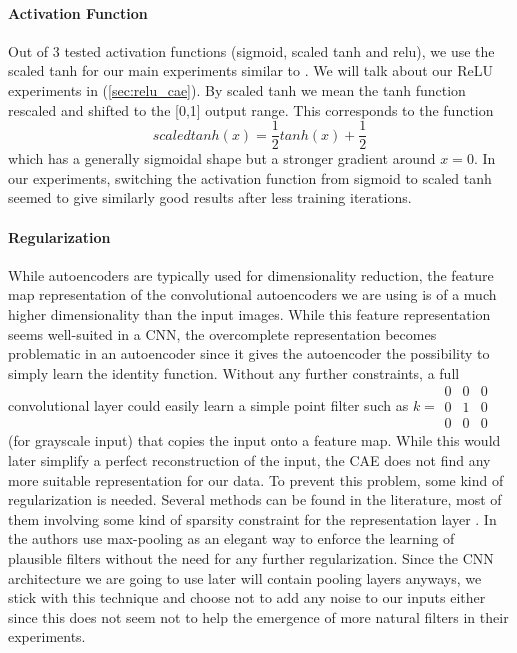 \documentclass{article}
\begin{document}
    \paragraph{Activation Function}
    \label{par:activation_function}

    Out of 3 tested activation functions (sigmoid, scaled tanh and relu), we use the scaled tanh for our main experiments similar to \citep{masci2011stacked}. We will talk about our ReLU experiments in (\ref{sec:relu_cae}). By scaled tanh we mean the tanh function rescaled and shifted to the [0,1] output range. This corresponds to the function $$scaledtanh(x) = \frac{1}{2}tanh(x) + \frac{1}{2}$$ which has a generally sigmoidal shape but a stronger gradient around $x = 0$. In our experiments, switching the activation function from sigmoid to scaled tanh seemed to give similarly good results after less training iterations. 

    \paragraph{Regularization} 
    While autoencoders are typically used for dimensionality reduction, the feature map representation of the convolutional autoencoders we are using is of a much higher dimensionality than the input images. While this feature representation seems well-suited in a CNN, the overcomplete representation becomes problematic in an autoencoder since it gives the autoencoder the possibility to simply learn the identity function. 
    Without any further constraints, a full convolutional layer could easily learn a simple point filter such as $k = \begin{smallmatrix} 0&0&0\\ 0&1&0 \\ 0&0&0 \end{smallmatrix}$ (for grayscale input) that copies the input onto a feature map. While this would later simplify a perfect reconstruction of the input, the CAE does not find any more suitable representation for our data. 
    To prevent this problem, some kind of regularization is needed. 
    Several methods can be found in the literature, most of them involving some kind of sparsity constraint for the representation layer \citep{Makhzani14}. In \citep{masci2011stacked} the authors use max-pooling as an elegant way to enforce the learning of plausible filters without the need for any further regularization. Since the CNN architecture we are going to use later will contain pooling layers anyways, we stick with this technique and choose not to add any noise to our inputs either since this does not seem not to help the emergence of more natural filters in their experiments. 
\end{document}

